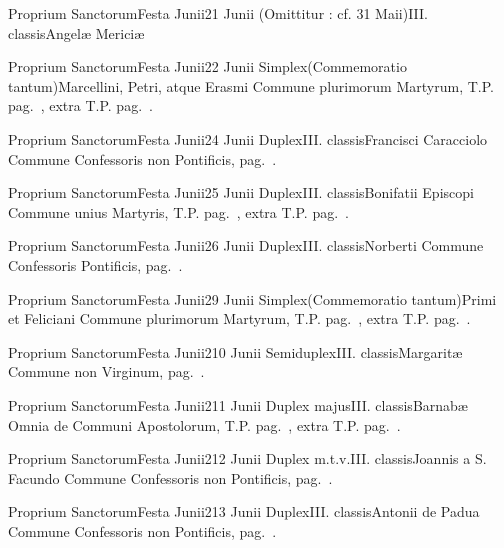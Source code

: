 \documentclass[nocturnale-romanum.tex]{subfiles}
\begin{document}

	{Proprium Sanctorum}{Festa Junii}{2}{1 Junii}
	{(Omittitur : cf. 31 Maii)}{III. classis}{Angelæ Mericiæ}
	{}
	{}

	{Proprium Sanctorum}{Festa Junii}{2}{2 Junii}
	{Simplex}{(Commemoratio tantum)}{Marcellini, Petri, atque Erasmi}
	{Commune plurimorum Martyrum, T.P. pag.\ \pageref{M-MRTP}, extra T.P. pag.\ \pageref{M-PMEX}.}
	{}

	{Proprium Sanctorum}{Festa Junii}{2}{4 Junii}
	{Duplex}{III. classis}{Francisci Caracciolo}
	{Commune Confessoris non Pontificis, pag.\ \pageref{M-CONP}.}
	{}

	{Proprium Sanctorum}{Festa Junii}{2}{5 Junii}
	{Duplex}{III. classis}{Bonifatii Episcopi}
	{Commune unius Martyris, T.P. pag.\ \pageref{M-MRTP}, extra T.P. pag.\ \pageref{M-UMEX}.}
	{}

	{Proprium Sanctorum}{Festa Junii}{2}{6 Junii}
	{Duplex}{III. classis}{Norberti}
	{Commune Confessoris Pontificis, pag.\ \pageref{M-COPO}.}
	{}

	{Proprium Sanctorum}{Festa Junii}{2}{9 Junii}
	{Simplex}{(Commemoratio tantum)}{Primi et Feliciani}
	{Commune plurimorum Martyrum, T.P. pag.\ \pageref{M-MRTP}, extra T.P. pag.\ \pageref{M-PMEX}.}
	{}

	{Proprium Sanctorum}{Festa Junii}{2}{10 Junii}
	{Semiduplex}{III. classis}{Margaritæ}
	{Commune non Virginum, pag.\ \pageref{M-MU}.}
	{}

	{Proprium Sanctorum}{Festa Junii}{2}{11 Junii}
	{Duplex majus}{III. classis}{Barnabæ}
	{Omnia de Communi Apostolorum, T.P. pag.\ \pageref{M-APTP}, extra T.P. pag.\ \pageref{M-APEX}.}
	{}

	{Proprium Sanctorum}{Festa Junii}{2}{12 Junii}
	{Duplex m.t.v.}{III. classis}{Joannis a S. Facundo}
	{Commune Confessoris non Pontificis, pag.\ \pageref{M-CONP}.}
	{}

	{Proprium Sanctorum}{Festa Junii}{2}{13 Junii}
	{Duplex}{III. classis}{Antonii de Padua}
	{Commune Confessoris non Pontificis, pag.\ \pageref{M-CONP}.}
	{}
\end{document}
